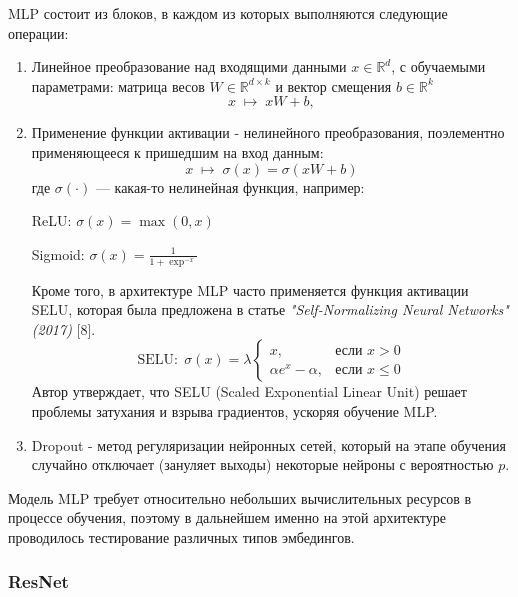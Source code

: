 \documentclass[12pt]{article}
\begin{document}
\noindent MLP состоит из блоков, в каждом из которых выполняются следующие операции:

\begin{enumerate}
    \item Линейное преобразование над входящими данными $x \in \mathbb{R}^d$, с обучаемыми параметрами: матрица весов $W \in \mathbb{R}^{d\times k}$ и вектор смещения $b \in \mathbb{R}^k$
    \begin{equation}
        x \;\mapsto\; xW + b,
    \end{equation}
    
    \item Применение функции активации - нелинейного преобразования, поэлементно применяющееся к пришедшим на вход данным:
    \begin{equation}
        x \;\mapsto\; \sigma(x) = \sigma(xW + b)
    \end{equation}
    где $\sigma(\cdot)$ — какая-то нелинейная функция, например: 
    
    ReLU: $\sigma(x) = \max(0, x)$

    Sigmoid: $\sigma(x) = \frac{1}{1 + \exp^{-x}}$
    
    Кроме того, в архитектуре MLP часто применяется функция активации SELU, которая была предложена в статье \textit{"Self-Normalizing Neural Networks" (2017)} [8]. 
    \begin{equation}
        \mathrm{SELU:} \; \sigma(x) = \lambda 
        \begin{cases} 
        x, & \text{если } x > 0 \\ 
        \alpha e^x - \alpha, & \text{если } x \leq 0 
        \end{cases}
    \end{equation}
    Автор утверждает, что SELU (Scaled Exponential Linear Unit) решает проблемы затухания и взрыва градиентов, ускоряя обучение MLP.

    \item Dropout - метод регуляризации нейронных сетей, который на этапе обучения случайно отключает (зануляет выходы) некоторые нейроны с вероятностью $p$.
\end{enumerate}

\noindent Модель MLP требует относительно небольших вычислительных ресурсов в процессе обучения, поэтому в дальнейшем именно на этой архитектуре проводилось тестирование различных типов эмбедингов.

\subsubsection{ResNet}
\end{document}
